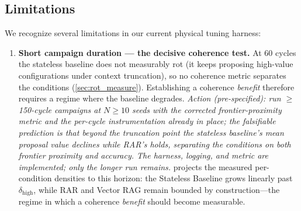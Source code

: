 \documentclass[conference]{IEEEtran}
\begin{document}
\subsection{Limitations}
\label{sec:limitations}

We recognize several limitations in our current physical tuning harness:
\begin{enumerate}[label=\textbf{L\arabic*.},leftmargin=2.2em,itemsep=3pt]
  \item \textbf{Short campaign duration --- the decisive coherence test.} At 60 cycles the stateless baseline does not measurably rot (it keeps proposing high-value configurations under context truncation), so no coherence metric separates the conditions (\cref{sec:rot_measure}). Establishing a coherence \emph{benefit} therefore requires a regime where the baseline degrades. \textit{Action (pre-specified): run $\geq$150-cycle campaigns at $N{\geq}10$ seeds with the corrected frontier-proximity metric and the per-cycle instrumentation already in place; the falsifiable prediction is that beyond the truncation point the stateless baseline's mean proposal value declines while RAR's holds, separating the conditions on both frontier proximity and accuracy. The harness, logging, and metric are implemented; only the longer run remains.}  projects the measured per-condition densities to this horizon: the Stateless Baseline grows linearly past $\delta_{\mathrm{high}}$, while RAR and Vector RAG remain bounded by construction---the regime in which a coherence \emph{benefit} should become measurable.


\end{enumerate}
\end{document}
